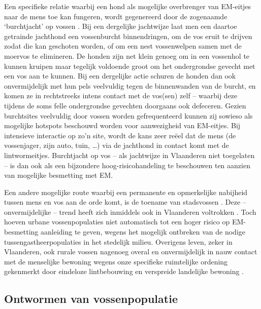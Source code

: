 \documentclass[twoside]{extreport}
\begin{document}
Een specifieke relatie waarbij een hond als mogelijke overbrenger van
EM-eitjes naar de mens toe kan fungeren, wordt gegenereerd door de
zogenaamde `burchtjacht' op vossen
\citep{fauna2009advies, vandenberge2011grote}. Bij een dergelijke
jachtwijze laat men een daartoe getrainde jachthond een vossenburcht
binnendringen, om de vos eruit te drijven zodat die kan geschoten
worden, of om een nest vossenwelpen samen met de moervos te elimineren.
De honden zijn net klein genoeg om in een vossenhol te kunnen kruipen
maar tegelijk voldoende groot om het ondergrondse gevecht met een vos
aan te kunnen. Bij een dergelijke actie schuren de honden dan ook
onvermijdelijk met hun pels veelvuldig tegen de binnenwanden van de
burcht, en komen ze in rechtstreeks intens contact met de vos(sen) zelf
-- waarbij deze tijdens de soms felle ondergrondse gevechten doorgaans
ook defeceren. Gezien burchtsites veelvuldig door vossen worden
gefrequenteerd kunnen zij sowieso als mogelijke hotspots beschouwd
worden voor aanwezigheid van EM-eitjes. Bij intensieve interactie op
zo'n site, wordt de kans zeer reëel dat de mens (de vossenjager, zijn
auto, tuin, \ldots{}) via de jachthond in contact komt met de
lintwormeitjes. Burchtjacht op vos -- als jachtwijze in Vlaanderen niet
toegelaten -- is dan ook als een bijzondere hoog-risicohandeling te
beschouwen ten aanzien van mogelijke besmetting met EM.

Een andere mogelijke route waarbij een permanente en opmerkelijke
nabijheid tussen mens en vos aan de orde komt, is de toename van
stadsvossen \citep{deplazes2004wilderness}. Deze -- onvermijdelijke --
trend heeft zich inmiddels ook in Vlaanderen voltrokken
\citep{vandenberge2013stadsvos}. Toch hoeven urbane vossenpopulaties
niet automatisch tot een hoger risico op EM-besmetting aanleiding te
geven, wegens het mogelijk ontbreken van de nodige
tussengastheerpopulaties in het stedelijk milieu. Overigens leven, zeker
in Vlaanderen, ook rurale vossen nagenoeg overal en onvermijdelijk in
nauw contact met de menselijke bewoning wegens onze specifieke
ruimtelijke ordening gekenmerkt door eindeloze lintbebouwing en
verspreide landelijke bewoning
\citep{vandenberge2011grote, vandenberge2013stadsvos, keune2013science}.

\subsection{Ontwormen van
vossenpopulatie}\label{ontwormen-van-vossenpopulatie}
\end{document}
